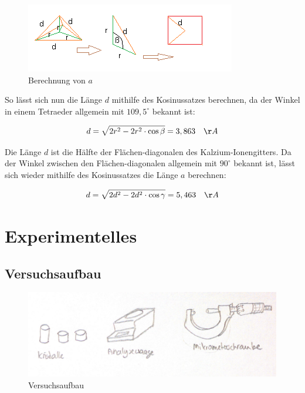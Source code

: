 \documentclass[12pt,a4paper,titlepage,headinclude,bibtotoc]{scrartcl}
\begin{document}
\begin{figure} [h]
\begin{center}
\includegraphics[scale=1]{a.png} \end{center}
\caption{Berechnung von $a$}
\end{figure} 

\newpage

So lässt sich nun die Länge $d$ mithilfe des Kosinussatzes berechnen, da der Winkel in einem Tetraeder allgemein mit $109,5^\circ$ bekannt ist:

\begin{equation}
 d = \sqrt{2r^2-2r^2 \cdot \cos \beta } = 3, 863 \quad \AA
\end{equation}     

Die Länge $d$ ist die Hälfte der Flächen-diagonalen des Kalzium-Ionengitters. Da der Winkel zwischen den Flächen-diagonalen allgemein mit $ 90^\circ $ bekannt ist, lässt sich wieder mithilfe des Kosinussatzes die Länge $a$ berechnen:

\begin{equation}
 d = \sqrt{2d^2-2d^2 \cdot \cos \gamma } = 5,463 \quad \AA
\end{equation}   

\section{Experimentelles}


\subsection{Versuchsaufbau}
\begin{figure} [h]
\begin{center}
\includegraphics[scale=1]{Versuchsaufbau2.png} \end{center}
\caption{Versuchsaufbau}
\end{figure} 
\end{document}
